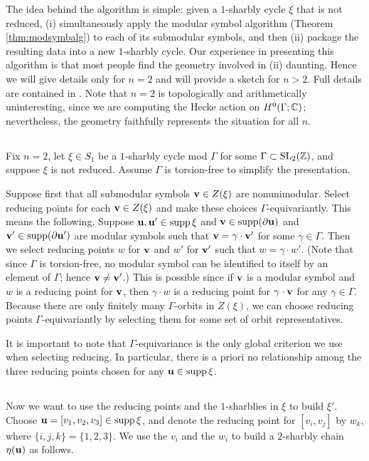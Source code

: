 The idea behind the algorithm is simple: given a $1$-sharbly cycle
$\xi$ that is not reduced, (i) simultaneously apply the modular symbol
algorithm (Theorem \ref{thm:modsymbalg}) to each of its submodular
symbols, and then (ii) package the resulting data into a new $1$-sharbly
cycle.  Our experience in presenting this algorithm is that most
people find the geometry involved in (ii) daunting.  Hence we will
give details only for $n=2$ and will provide a sketch for $n>2$.
Full details are contained in \cite{experimental}.  Note that $n=2$ is
topologically and arithmetically uninteresting, since we are computing
the Hecke action on $H^{0} (\Gamma ; \mathbb{C})$; nevertheless, the geometry
faithfully represents the situation for all $n$.

\subsection{}\label{sl2.start}
%
Fix $n=2$, let $\xi \in S_{1}$ be a $1$-sharbly cycle mod $\Gamma$ for
some $\Gamma \subset \operatorname{SL}_{2} (\mathbb{Z} )$, and suppose $\xi $ is not
reduced.  Assume $\Gamma$ is torsion-free to simplify the
presentation.  

Suppose first that all submodular symbols ${\mathbf {v}} \in Z (\xi )$ are
nonunimodular.  Select reducing points for each ${\mathbf {v}} \in Z (\xi )$
and make these choices $\Gamma $-equivariantly.  This means the
following.  Suppose ${\mathbf {u}},{\mathbf {u}} '\in \operatorname{supp} \xi $ and ${\mathbf {v}} \in \operatorname{supp}
(\partial {\mathbf {u}} )$ and ${\mathbf {v}}' \in \operatorname{supp} (\partial {\mathbf {u}}' )$ are modular
symbols such that ${\mathbf {v}} = \gamma\cdot {\mathbf {v}} ' $ for some $\gamma \in
\Gamma $.  Then we select reducing points $w$ for ${\mathbf {v}} $ and $w'$ for
${\mathbf {v}} '$ such that $w = \gamma\cdot w'$.  (Note that since $\Gamma$ is
torsion-free, no modular symbol can be identified to itself by an
element of $\Gamma$; hence ${\mathbf {v}} \not = {\mathbf {v}} '$.)  This is possible
since if ${\mathbf {v}} $ is a modular symbol and $w$ is a reducing point for
${\mathbf {v}} $, then $\gamma \cdot w $ is a reducing point for $\gamma \cdot
{\mathbf {v}}$ for any $\gamma \in \Gamma $.  Because there are only finitely
many $\Gamma $-orbits in $Z (\xi )$, we can choose reducing points
$\Gamma $-equivariantly by selecting them for some set of orbit
representatives.

It is important to note that $\Gamma $-equivariance is the only
global criterion we use when selecting reducing.  In
particular, there is a priori no relationship among the three reducing
points chosen for any ${\mathbf {u}} \in \operatorname{supp} \xi $.

\subsection{}\label{ss:buildingxiprime}
%
Now we want to use the reducing points and the $1$-sharblies in $\xi$ to
build $\xi '$.  Choose ${\mathbf {u}} = [v_{1},v_{2},v_{3}]\in
\operatorname{supp} \xi $, and denote the reducing point for $[v_{i},v_{j}]$ by $w_{k}$,
where $\{i,j,k \} = \{1,2,3 \}$.  We use the $v_{i}$ and the
$w_{i}$ to build a $2$-sharbly chain $\eta ({\mathbf {u}} )$ as follows.

